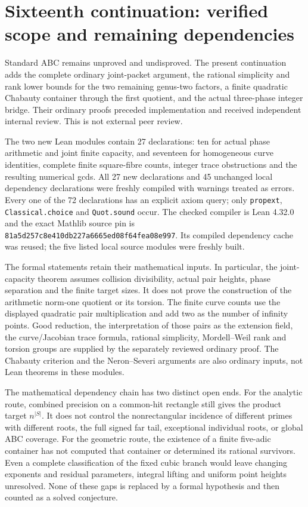 \section{Sixteenth continuation: verified scope and remaining dependencies}
\label{jpj-status}

Standard ABC remains unproved and undisproved. The present continuation
adds the complete ordinary joint-packet argument, the rational simplicity
and rank lower bounds for the two remaining genus-two factors, a finite
quadratic Chabauty container through the first quotient, and the actual
three-phase integer bridge. Their ordinary proofs preceded implementation
and received independent internal review. This is not external peer review.

The two new Lean modules contain 27 declarations: ten for actual phase
arithmetic and joint finite capacity, and seventeen for homogeneous curve
identities, complete finite square-fibre counts, integer trace obstructions
and the resulting numerical gcds. All 27 new declarations and 45 unchanged
local dependency declarations were freshly compiled with warnings treated
as errors. Every one of the 72 declarations has an explicit axiom query;
only \texttt{propext}, \texttt{Classical.choice} and \texttt{Quot.sound}
occur. The checked compiler is Lean 4.32.0 and the exact Mathlib source pin is
\texttt{81a5d257c8e410db227a6665ed08f64fea08e997}. Its compiled dependency
cache was reused; the five listed local source modules were freshly built.

The formal statements retain their mathematical inputs. In particular,
the joint-capacity theorem assumes collision divisibility, actual pair
heights, phase separation and the finite target sizes. It does not prove
the construction of the arithmetic norm-one quotient or its torsion.
The finite curve counts use the displayed quadratic pair multiplication
and add two as the number of infinity points. Good reduction, the
interpretation of those pairs as the extension field, the curve/Jacobian
trace formula, rational simplicity, Mordell--Weil rank and torsion groups
are supplied by the separately reviewed ordinary proof. The Chabauty
criterion and the Neron--Severi arguments are also ordinary inputs, not
Lean theorems in these modules.

The mathematical dependency chain has two distinct open ends. For the
analytic route, combined precision on a common-hit rectangle still gives
the product target $n^{|S|}$. It does not control the nonrectangular
incidence of different primes with different roots, the full signed
far tail, exceptional individual roots, or global ABC coverage. For the
geometric route, the existence of a finite five-adic container has not
computed that container or determined its rational survivors. Even a
complete classification of the fixed cubic branch would leave changing
exponents and residual parameters, integral lifting and uniform point
heights unresolved. None of these gaps is replaced by a formal hypothesis
and then counted as a solved conjecture.

